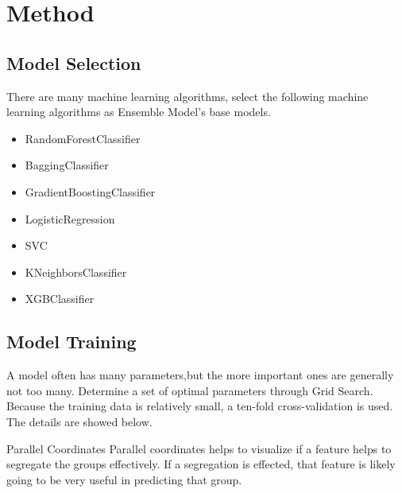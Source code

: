 \section{Method}

\subsection{Model Selection}
There are many machine learning algorithms, select the following machine learning algorithms as Ensemble Model’s base models. 

\begin{itemize}
	\item RandomForestClassifier
	\item BaggingClassifier
	\item GradientBoostingClassifier
	\item LogisticRegression
	\item SVC
	\item KNeighborsClassifier 
	\item XGBClassifier
\end{itemize}

\subsection{Model Training}
A model often has many parameters,but the more important ones are generally not too many. Determine a set of optimal parameters through Grid Search. Because the training data is relatively small, a ten-fold cross-validation is used. The details are showed below. 

Parallel Coordinates 
Parallel coordinates helps to visualize if a feature helps to segregate the groups effectively. If a segregation is effected, that feature is likely going to be very useful in predicting that group.


